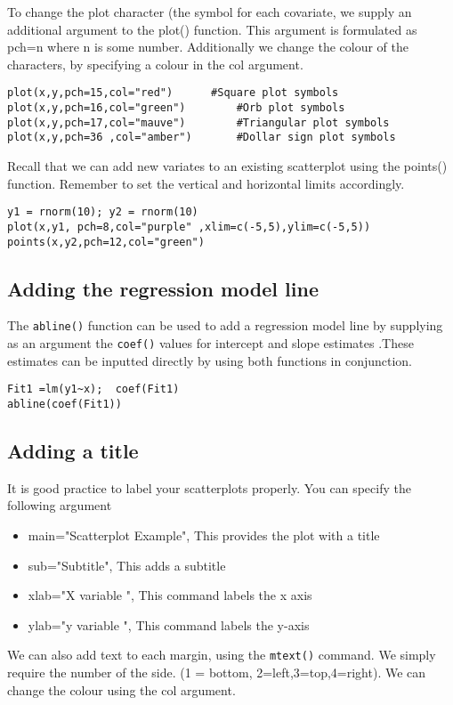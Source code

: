 To change the plot character (the symbol for each covariate, we supply an additional argument to the plot() function.  This argument is formulated as pch=n where n is some number.
Additionally we change the colour of the characters, by specifying a colour in the col argument.
\footnotesize \begin{verbatim}
plot(x,y,pch=15,col="red")		#Square plot symbols
plot(x,y,pch=16,col="green")		#Orb plot symbols
plot(x,y,pch=17,col="mauve")		#Triangular plot symbols
plot(x,y,pch=36	,col="amber")		#Dollar sign plot symbols
\end{verbatim}\normalsize
Recall that we can add new variates to an existing scatterplot using the points() function. Remember to set the vertical and horizontal limits accordingly.
\footnotesize \begin{verbatim}
y1 = rnorm(10); y2 = rnorm(10)
plot(x,y1, pch=8,col="purple" ,xlim=c(-5,5),ylim=c(-5,5))
points(x,y2,pch=12,col="green")
\end{verbatim}\normalsize
\subsection{Adding the regression model line}

The \texttt{abline()} function can be used to add a regression model line  by supplying as an argument the \texttt{coef()} values for intercept and slope estimates .These estimates can be inputted directly by using both functions in conjunction.

\footnotesize \begin{verbatim}
Fit1 =lm(y1~x);  coef(Fit1)
abline(coef(Fit1))	
\end{verbatim}\normalsize

\subsection{Adding a title }

It is good practice to label your scatterplots properly. You can specify the following argument
\begin{itemize}
\item	main="Scatterplot Example", 	This provides the plot with a title
\item	sub="Subtitle",                 This adds a subtitle
\item	xlab="X variable ",				This command labels the x axis 
\item   ylab="y variable ",				This command labels the y-axis
\end{itemize}
We can also add text to each margin, using the \texttt{mtext()} command.  
We simply require the number of the side. (1 = bottom, 2=left,3=top,4=right). 
We can change the colour using the col argument.

